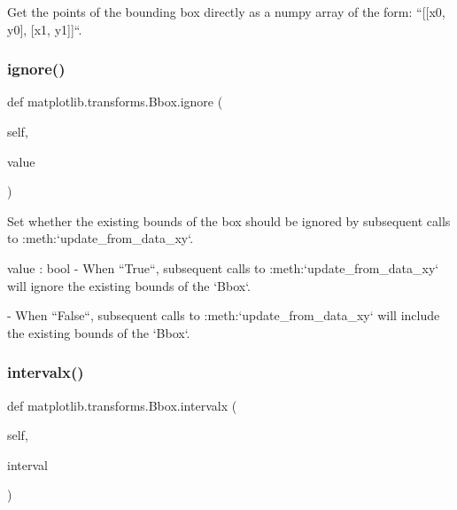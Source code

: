 \begin{DoxyVerb}Get the points of the bounding box directly as a numpy array
of the form: ``[[x0, y0], [x1, y1]]``.
\end{DoxyVerb}
 \mbox{\label{classmatplotlib_1_1transforms_1_1Bbox_a4e5249c93be234e4b73701e903db6ecd}} 
\subsubsection{\texorpdfstring{ignore()}{ignore()}}
{\footnotesize\ttfamily def matplotlib.\+transforms.\+Bbox.\+ignore (\begin{DoxyParamCaption}\item[{}]{self,  }\item[{}]{value }\end{DoxyParamCaption})}

\begin{DoxyVerb}Set whether the existing bounds of the box should be ignored
by subsequent calls to :meth:`update_from_data_xy`.

value : bool
   - When ``True``, subsequent calls to :meth:`update_from_data_xy`
     will ignore the existing bounds of the `Bbox`.

   - When ``False``, subsequent calls to :meth:`update_from_data_xy`
     will include the existing bounds of the `Bbox`.
\end{DoxyVerb}
 \mbox{\label{classmatplotlib_1_1transforms_1_1Bbox_a6490789ed380e8a38da14dcf18883dd1}} 
\subsubsection{\texorpdfstring{intervalx()}{intervalx()}}
{\footnotesize\ttfamily def matplotlib.\+transforms.\+Bbox.\+intervalx (\begin{DoxyParamCaption}\item[{}]{self,  }\item[{}]{interval }\end{DoxyParamCaption})}

